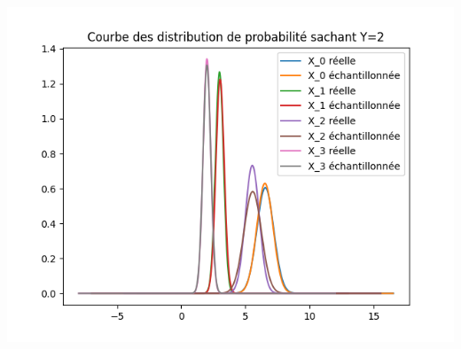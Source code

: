 \documentclass[
]{article}
\begin{document}
\includegraphics{../res/sample_compare_Y_2.png}
\end{document}

